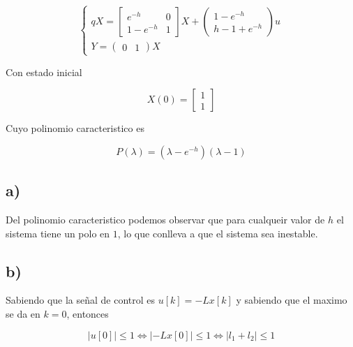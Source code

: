 \documentclass[11pt,a4paper]{article}
\newcommand{\siseq}[1]{ \left\{ \begin{array}{c}
    #1
\end{array} \right. }
\begin{document}
    \begin{equation}
        \siseq{
            qX = 
            \begin{bmatrix}
                e^{-h} & 0 \\ 
                1-e^{-h} & 1
            \end{bmatrix} X
            + 
            \begin{pmatrix}
                1 - e^{-h} \\ 
                h - 1 + e^{-h}
            \end{pmatrix} u \\ 
            Y = 
            \begin{pmatrix}
                0 & 1
            \end{pmatrix} X
        }
    \end{equation}

    Con estado inicial 

    \begin{equation}
        X(0) = 
        \begin{bmatrix}
            1 \\ 1
        \end{bmatrix}
    \end{equation}

    Cuyo polinomio caracteristico es 
    
    \begin{equation}
        P(\lambda) = (\lambda - e^{-h})(\lambda - 1)
    \end{equation}

    \subsection*{a)}

    Del polinomio caracteristico podemos observar que para cualqueir valor de $h$ el sistema tiene un polo en $1$, lo que conlleva 
    a que el sistema sea inestable.
    
    \subsection*{b)}

    Sabiendo que la señal de control es $u[k]=-Lx[k]$ y sabiendo que el maximo se da en $k=0$, entonces 
    
    \begin{equation}
        |u[0]| \leq 1 \Leftrightarrow |-Lx[0]| \leq 1 \Leftrightarrow
        |l_1 + l_2 |\leq 1 
    \end{equation}
\end{document}
